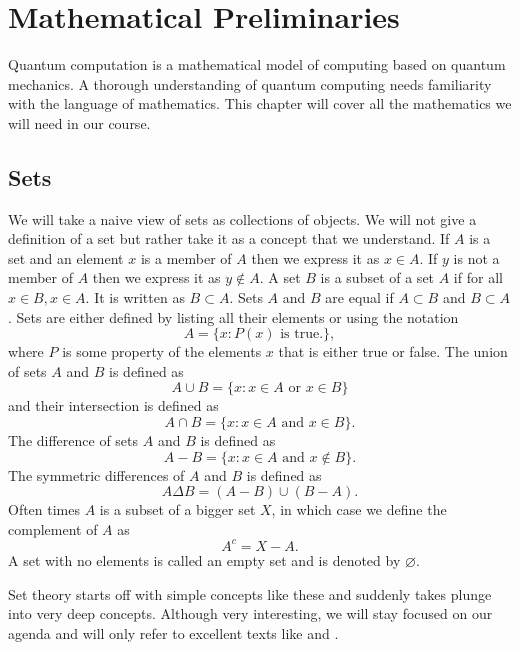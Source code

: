 \chapter{Mathematical Preliminaries}\label{c1}
Quantum computation is a mathematical model of computing based on quantum 
mechanics. A thorough understanding of quantum computing needs familiarity with 
the language of mathematics. This chapter will cover all the mathematics we 
will need in our course.

\section{Sets}\label{c1s1}
We will take a naive view of sets as collections of objects. We will not give a 
definition of a set but rather take it as a concept that we understand. If $A$ 
is a set and an element $x$ is a member of $A$ then we express it as $x \in A$. 
If $y$ is not a member of $A$ then we express it as $y \notin A$. A set $B$ is 
a subset of a set $A$ if for all $x \in B, x \in A$. It is written as $B \subset
 A$. Sets $A$ and $B$ are equal if $A \subset B$ and $B \subset A$. Sets are 
either defined by listing all their elements or using the notation
\[
A = \{x : P(x) \text{ is true.}\},
\]
where $P$ is some property of the elements $x$ that is either true or false. 
The union of sets $A$ and $B$ is defined as
\begin{equation}\label{c1s1e1}
A \cup B = \{x : x \in A \text{ or } x \in B\}
\end{equation}
and their intersection is defined as
\begin{equation}\label{c1s1e2}
A \cap B = \{x : x \in A \text{ and } x \in B\}.
\end{equation}
The difference of sets $A$ and $B$ is defined as
\begin{equation}\label{c1s1e3}
A - B = \{x : x \in A \text{ and } x \notin B\}.
\end{equation}
The symmetric differences of $A$ and $B$ is defined as
\begin{equation}\label{c1s2e4}
A \Delta B = (A - B) \cup (B - A).
\end{equation}
Often times $A$ is a subset of a bigger set $X$, in which case we define
the complement of $A$ as
\begin{equation}\label{c1s2e5}
A^c = X - A.
\end{equation}
A set with no elements is called an empty set and is denoted by $\varnothing$.

Set theory starts off with simple concepts like these and suddenly takes plunge 
into very deep concepts. Although very interesting, we will stay focused on our
agenda and will only refer to excellent texts like \cite{halmos1960naive} and
\cite{lewis1981elements}.

